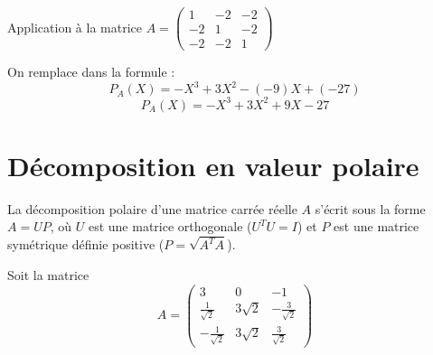 \documentclass[french]{yLectureNote}
\begin{document}
 Application à la matrice $A = \begin{pmatrix} 1 & -2 & -2 \\ -2 & 1 & -2 \\ -2 & -2 & 1 \end{pmatrix}$


On remplace dans la formule :
$$P_A(X) = -X^3 + 3X^2 - (-9)X + (-27)$$
$$P_A(X) = -X^3 + 3X^2 + 9X - 27$$

\section{Décomposition en valeur polaire}

La décomposition polaire d'une matrice carrée réelle $A$ s'écrit sous la forme $A = UP$, où $U$ est une matrice orthogonale ($U^T U = I$) et $P$ est une matrice symétrique définie positive ($P = \sqrt{A^T A}$).

Soit la matrice 
$$A = \begin{pmatrix} 3 & 0 & -1 \\ \frac{1}{\sqrt{2}} & 3\sqrt{2} & -\frac{3}{\sqrt{2}} \\ -\frac{1}{\sqrt{2}} & 3\sqrt{2} & \frac{3}{\sqrt{2}} \end{pmatrix}$$
\end{document}
